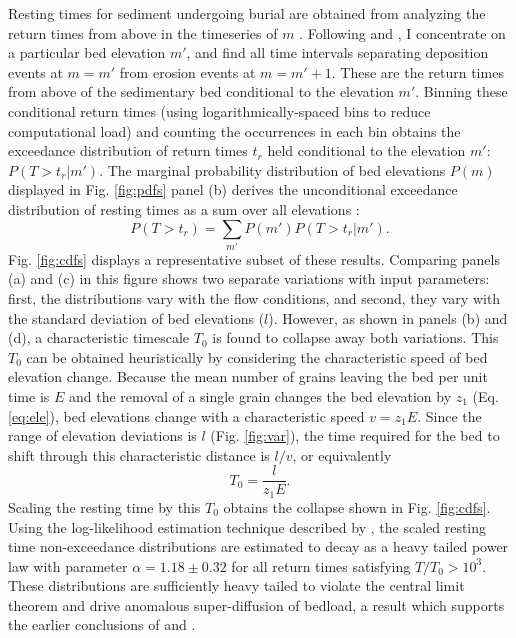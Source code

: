 Resting times for sediment undergoing burial are obtained from analyzing the return times from above in the timeseries of $m$ \citep[e.g.][]{Redner2007}.
Following \citet{Voepel2013} and \citet{Martin2014}, I concentrate on a particular bed elevation $m'$, and find all time intervals separating deposition events at $m=m'$ from erosion events at $m=m'+1$.
These are the return times from above of the sedimentary bed conditional to the elevation $m'$.
Binning these conditional return times (using logarithmically-spaced bins to reduce computational load) and counting the occurrences in each bin obtains the exceedance distribution of return times $t_r$ held conditional to the elevation $m'$: $P(T>t_r|m')$.
The marginal probability distribution of bed elevations $P(m)$ displayed in Fig. \ref{fig:pdfs} panel (b) derives the unconditional exceedance distribution of resting times as a sum over all elevations \citep{Yang1971, Nakagawa1980, Voepel2013, Martin2014}: 
\begin{equation} P(T>t_r) = \sum_{m'} P(m') P(T>t_r|m') .\end{equation}
Fig. \ref{fig:cdfs} displays a representative subset of these results.
Comparing panels (a) and (c) in this figure shows two separate variations with input parameters: first, the distributions vary with the flow conditions, and second, they vary with the standard deviation of bed elevations ($l$).
However, as shown in panels (b) and (d), a characteristic timescale $T_0$ is found to collapse away both variations.
This $T_0$ can be obtained heuristically by considering the characteristic speed of bed elevation change.
Because the mean number of grains leaving the bed per unit time is $E$ and the removal of a single grain changes the bed elevation by $z_1$ (Eq. \ref{eq:ele}), bed elevations change with a characteristic speed $v = z_1 E$.
Since the range of elevation deviations is $l$ (Fig. \ref{fig:var}), the time required for the bed to shift through this characteristic distance is $l/v$, or equivalently
\begin{equation} T_0 = \frac{l}{z_1 E}.\label{eq:time}\end{equation}
Scaling the resting time by this $T_0$ obtains the collapse shown in Fig. \ref{fig:cdfs}.
Using the log-likelihood estimation technique described by \citet{Newman2005}, the scaled resting time non-exceedance distributions are estimated to decay as a heavy tailed power law with parameter $\alpha = 1.18 \pm 0.32$ for all return times satisfying $T/T_0 > 10^3$.
These distributions are sufficiently heavy tailed to violate the central limit theorem and drive anomalous super-diffusion of bedload, a result which supports the earlier conclusions of \citet{Voepel2013} and \citet{Martin2014}.

